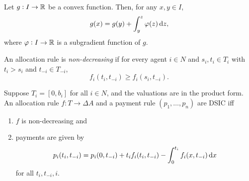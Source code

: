 		\begin{lemma}
			\label{lem: subgrad int}
			Let $g : I \to \mathbb{R}$ be a convex function. Then, for any $x,y \in I$,
			\[ g(x) = g(y) + \int_y^z \varphi(z) \dif z, \]
			where $\varphi:I \to \mathbb{R}$ is a subgradient function of $g$.
		\end{lemma}

		\begin{fdef}
			An allocation rule is \emph{non-decreasing} if for every agent $i \in N$ and $s_i,t_i \in T_i$ with $t_i > s_i$ and $t_{-i} \in T_{-i}$,
			\[ f_i(t_i,t_{-i}) \ge f_i(s_i,t_{-i}). \]
		\end{fdef}

		\begin{ftheo}[Myerson]
			\label{theo: myerson}
			Suppose $T_i = [0,b_i]$ for all $i \in N$, and the valuations are in the product form. An allocation rule $f : T \to \Delta A$ and a payment rule $(p_1,\ldots,p_n)$ are DSIC iff
			\begin{enumerate}[label=(\alph*)]
				\item $f$ is non-decreasing and
				\item payments are given by
				\[ p_i(t_i,t_{-i}) = p_i(0,t_{-i}) + t_i f_i(t_i,t_{-i}) - \int_0^{t_i} f_i(x,t_{-i}) \dif x \]
				for all $t_i,t_{-i},i$.
			\end{enumerate}
		\end{ftheo}
